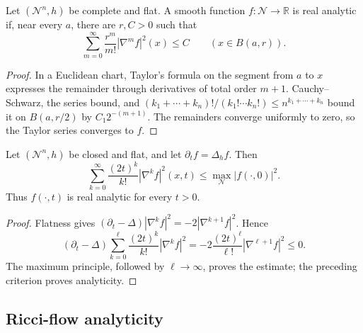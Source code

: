 \begin{example}
\label{ex:chow-ii-flat-factorial-analyticity-criterion}
Let \((\mathcal N^n,h)\) be complete and flat.  A smooth function
\(f:\mathcal N\to\mathbb R\) is real analytic if, near every \(a\), there
are \(r,C>0\) such that
\[
 \sum_{m=0}^{\infty}\frac{r^m}{m!}|\nabla^mf|^2(x)\leq C
 \qquad(x\in B(a,r)).
\]
\end{example}
\begin{proof}
In a Euclidean chart, Taylor's formula on the segment from \(a\) to \(x\)
expresses the remainder through derivatives of total order \(m+1\).
Cauchy--Schwarz, the series bound, and
\((k_1+\cdots+k_n)!/(k_1!\cdots k_n!)\leq n^{k_1+\cdots+k_n}\) bound it on
\(B(a,r/2)\) by \(C_1 2^{-(m+1)}\).  The remainders converge uniformly to
zero, so the Taylor series converges to \(f\).
\end{proof}

\begin{proposition}
\label{prop:chow-ii-flat-heat-real-analyticity}
Let \((\mathcal N^n,h)\) be closed and flat, and let
\(\partial_tf=\Delta_hf\).  Then
\[
 \sum_{k=0}^{\infty}\frac{(2t)^k}{k!}|\nabla^kf|^2(x,t)
 \leq\max_{\mathcal N}|f(\cdot,0)|^2.
\]
Thus \(f(\cdot,t)\) is real analytic for every \(t>0\).
\end{proposition}
\begin{proof}
Flatness gives
\((\partial_t-\Delta)|\nabla^kf|^2=-2|\nabla^{k+1}f|^2\).  Hence
\[
 (\partial_t-\Delta)\sum_{k=0}^{\ell}
 \frac{(2t)^k}{k!}|\nabla^kf|^2
 =-2\frac{(2t)^\ell}{\ell!}|\nabla^{\ell+1}f|^2\leq0.
\]
The maximum principle, followed by \(\ell\to\infty\), proves the estimate;
the preceding criterion proves analyticity.
\end{proof}

\subsection{Ricci-flow analyticity}

